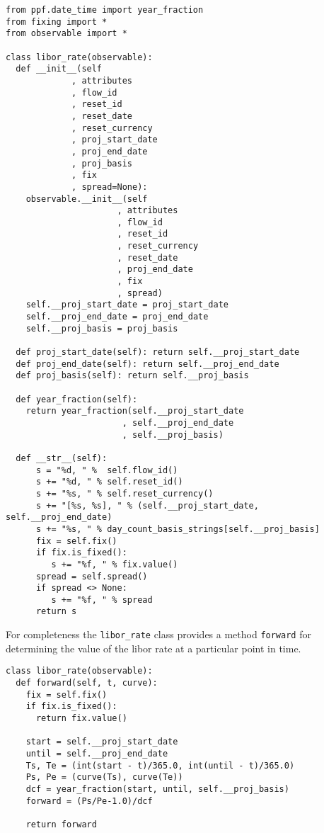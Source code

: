 \begin{verbatim}
from ppf.date_time import year_fraction
from fixing import *
from observable import *

class libor_rate(observable):
  def __init__(self
             , attributes
             , flow_id
             , reset_id
             , reset_date
             , reset_currency
             , proj_start_date
             , proj_end_date
             , proj_basis
             , fix
             , spread=None):
    observable.__init__(self
                      , attributes
                      , flow_id
                      , reset_id
                      , reset_currency
                      , reset_date
                      , proj_end_date
                      , fix
                      , spread)
    self.__proj_start_date = proj_start_date
    self.__proj_end_date = proj_end_date
    self.__proj_basis = proj_basis

  def proj_start_date(self): return self.__proj_start_date
  def proj_end_date(self): return self.__proj_end_date
  def proj_basis(self): return self.__proj_basis

  def year_fraction(self):
    return year_fraction(self.__proj_start_date
                       , self.__proj_end_date
                       , self.__proj_basis)

  def __str__(self):
      s = "%d, " %  self.flow_id()
      s += "%d, " % self.reset_id()
      s += "%s, " % self.reset_currency()
      s += "[%s, %s], " % (self.__proj_start_date, self.__proj_end_date)
      s += "%s, " % day_count_basis_strings[self.__proj_basis]
      fix = self.fix()
      if fix.is_fixed():
         s += "%f, " % fix.value()
      spread = self.spread()
      if spread <> None:
         s += "%f, " % spread
      return s

\end{verbatim}
For completeness the \verb|libor_rate| class provides a method \verb|forward| 
for determining the value of the libor rate at a particular point in time.
\begin{verbatim}
class libor_rate(observable):
  def forward(self, t, curve):
    fix = self.fix()
    if fix.is_fixed():
      return fix.value()

    start = self.__proj_start_date
    until = self.__proj_end_date
    Ts, Te = (int(start - t)/365.0, int(until - t)/365.0)
    Ps, Pe = (curve(Ts), curve(Te))
    dcf = year_fraction(start, until, self.__proj_basis)
    forward = (Ps/Pe-1.0)/dcf

    return forward
\end{verbatim}

